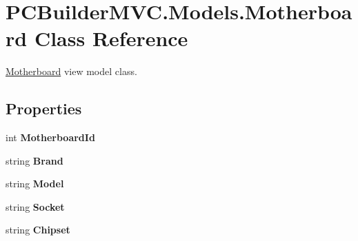 \hypertarget{class_p_c_builder_m_v_c_1_1_models_1_1_motherboard}{}\section{P\+C\+Builder\+M\+V\+C.\+Models.\+Motherboard Class Reference}
\label{class_p_c_builder_m_v_c_1_1_models_1_1_motherboard}


\hyperlink{class_p_c_builder_m_v_c_1_1_models_1_1_motherboard}{Motherboard} view model class.  


\subsection*{Properties}
\begin{DoxyCompactItemize}
\item 
int {\bfseries Motherboard\+Id}\hypertarget{class_p_c_builder_m_v_c_1_1_models_1_1_motherboard_adc616659ca7e2381b59c71e282f32b0c}{}\label{class_p_c_builder_m_v_c_1_1_models_1_1_motherboard_adc616659ca7e2381b59c71e282f32b0c}

\item 
string {\bfseries Brand}\hypertarget{class_p_c_builder_m_v_c_1_1_models_1_1_motherboard_a45b69456d5d3fb16a0714bd0097f48eb}{}\label{class_p_c_builder_m_v_c_1_1_models_1_1_motherboard_a45b69456d5d3fb16a0714bd0097f48eb}

\item 
string {\bfseries Model}\hypertarget{class_p_c_builder_m_v_c_1_1_models_1_1_motherboard_a8726c74436e9d6e99b3f57c4641e6bdf}{}\label{class_p_c_builder_m_v_c_1_1_models_1_1_motherboard_a8726c74436e9d6e99b3f57c4641e6bdf}

\item 
string {\bfseries Socket}\hypertarget{class_p_c_builder_m_v_c_1_1_models_1_1_motherboard_aa6d3f08365a197f5c1ea6e32e70d91db}{}\label{class_p_c_builder_m_v_c_1_1_models_1_1_motherboard_aa6d3f08365a197f5c1ea6e32e70d91db}

\item 
string {\bfseries Chipset}\hypertarget{class_p_c_builder_m_v_c_1_1_models_1_1_motherboard_a965931a786ee5851dfc785af9a24758b}{}\label{class_p_c_builder_m_v_c_1_1_models_1_1_motherboard_a965931a786ee5851dfc785af9a24758b}


\end{DoxyCompactItemize}
